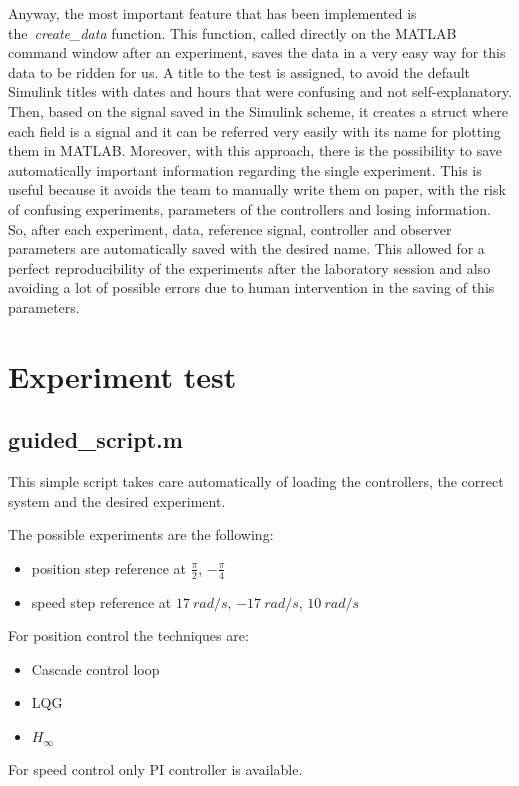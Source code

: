 \documentclass{report}
\begin{document}
Anyway, the most important feature that has been implemented is the~\textit{create\_data} function. This function, called directly on the MATLAB command window after an experiment, saves the data in a very easy way for this data to be ridden for us. 
A title to the test is assigned, to avoid the default Simulink titles with dates and hours that were confusing and not self-explanatory.
Then, based on the signal saved in the Simulink scheme, it creates a struct where each field is a signal and it can be referred very easily with its name for plotting them in MATLAB.
Moreover, with this approach, there is the possibility to save automatically important information regarding the single experiment. This is useful because it avoids the team to manually write them on paper, with the risk of confusing experiments, parameters of the controllers and losing information. 
So, after each experiment, data, reference signal, controller and observer parameters are automatically saved with the desired name. This allowed for a perfect reproducibility of the experiments after the laboratory session and also avoiding a lot of possible errors due to human intervention in the saving of this parameters.

\chapter{Experiment test}
\section{guided\_script.m}
This simple script takes care automatically of loading the controllers, the correct system and the desired experiment.

The possible experiments are the following: 
\begin{itemize}
	\item position step reference at $\frac{\pi}{2}$, $-\frac{\pi}{4}$
	\item speed step reference at $17\ rad/s$, $-17\ rad/s$, $10\ rad/s$
\end{itemize}

For position control the techniques are:
\begin{itemize}
	\item Cascade control loop
	\item LQG
	\item $H_{\infty}$
\end{itemize}

For speed control only PI controller is available. 
\end{document}
